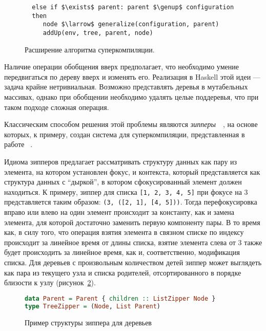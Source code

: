 \begin{figure}[h!]
\begin{lstlisting}
  else if $\exists$ parent: parent $\genup$ configuration
  then
     node $\larrow$ generalize(configuration, parent)
     addUp(env, tree, parent, node)
\end{lstlisting}
\caption{Расширение алгоритма суперкомпиляции.}
\label{fig:scalgogenExtended}
\end{figure}

Наличие операции обобщения вверх предполагает, что необходимо умение передвигаться по дереву вверх и изменять его.
Реализация в Haskell этой идеи --- задача крайне нетривиальная. Возможно представлять
деревья в мутабельных массивах, однако при обобщении необходимо удалять целые поддеревья,
что при таком подходе сложная операция.

Классическим способом решения этой проблемы являются \emph{зипперы}~~\cite{zipper},
на основе которых, к примеру, создан система для суперкомпиляции,
представленная в работе ~\cite{optimus}.

Идиома зипперов предлагает рассматривать структуру данных как пару из элемента,
на котором установлен фокус, и контекста, который представляется как структура данных
с ``дыркой'', в котором сфокусированный элемент должен находиться.
К примеру, зиппер для списка \lstinline{[1, 2, 3, 4, 5]} при фокусе на 3 представляется
таким образом: \lstinline{(3, ([2, 1], [4, 5]))}.
Тогда перефокусировка вправо или влево на один элемент происходит за константу,
как и замена элемента, для которой достаточно заменить первую компоненту пары.
В то время как, в силу того, что операция взятия элемента в связном списке по индексу
происходит за линейное время от длины списка, взятие элемента слева от 3 также
будет происходить за линейное время, как и, соответственно, модификация списка.
Для деревьев с произвольным количеством детей зиппер может выглядеть
как пара из текущего узла и списка родителей, отсортированного в порядке
близости к узлу (рисунок~\ref{fig:zipper}).

\begin{figure}[h!]
\begin{lstlisting}[mathescape,language=Haskell,extendedchars=\true,frame=single,basicstyle=\ttfamily]
data Parent = Parent { children :: ListZipper Node }
type TreeZipper = (Node, List Parent)
\end{lstlisting}
\caption{Пример структуры зиппера для деревьев}
\label{fig:zipper}
\end{figure}


